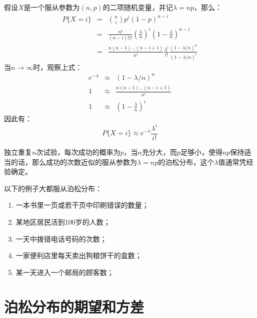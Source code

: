\documentclass[10pt,a4paper,UTF8]{article}
\begin{document}
假设\(X\)是一个服从参数为\((n,p)\)的二项随机变量，并记\(\lambda = np\)，那么：
\begin{eqnarray}
\label{eq:3}
P\{X=i\}&=& \binom{n}{i} p^{i}(1-p)^{n-i} \\
&=& \frac{ n! }{(n-i)!i!}(\frac{\lambda}{n})^{i}(1-\frac{\lambda}{n})^{n-i} \\
&=& \frac{n(n-1)\ldots (n-i+1)}{n^{i}} \frac{\lambda^{i}}{i!} \frac{ (1-\lambda/n)^{n} }{ (1- \lambda/n)^{i}  }
\end{eqnarray}
当\(n\to \infty\)时，观察上式：
\begin{eqnarray}
\label{eq:4}
e^{-\lambda}&\approx& (1-\lambda/n)^{n} \\
1&\approx& \frac{n(n-1)\ldots (n-i+1)}{n^{i}} \\
1 &\approx& (1-\frac{\lambda}{n})^{i}
\end{eqnarray}
因此有：
\begin{equation}
\label{eq:5}
P\{ X=i\} \approx e^{-\lambda} \frac{\lambda^{i}}{i!}
\end{equation}

独立重复\(n\)次试验，每次成功的概率为\(p\)，当\(n\)充分大，而\(p\)足够小，使得\(np\)保持适当的话，那么成功的次数近似的服从参数为\(\lambda =  np\)的泊松分布，这个\(\lambda\)值通常凭经验确定。

以下的例子大都服从泊松分布：
\begin{enumerate}
\item 一本书里一页或若干页中印刷错误的数量；
\item 某地区居民活到100岁的人数；
\item 一天中拨错电话号码的次数；
\item 一家便利店里每天卖出狗粮饼干的盒数；
\item 某一天进入一个邮局的顾客数；
\end{enumerate}

\section{泊松分布的期望和方差}
\label{sec:orgf0a2a5b}
\end{document}
